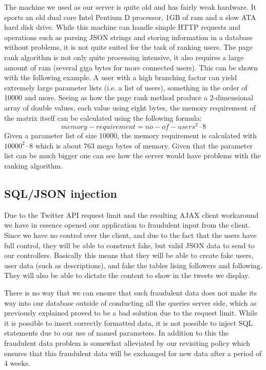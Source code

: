 The machine we used as our server is quite old and has fairly weak hardware. It sports an old dual core Intel Pentium D processor, 1GB of ram and a slow ATA hard disk drive. While this machine can handle simple HTTP requests and operations such as parsing JSON strings and storing information in a database without problems, it is not quite suited for the task of ranking users. The page rank algorithm is not only quite processing intensive, it also requires a large amount of ram (several giga bytes for more connected users). This can be shown with the following example. A user with a high branching factor can yield extremely large parameter lists (i.e. a list of users), something in the order of 10000 and more. Seeing as how the page rank method produce a 2-dimensional array of double values, each value using eight bytes, the memory requirement of the matrix itself can be calculated using the following formula:
\begin{displaymath}
memory-requirement = no-of-users^2 \cdot 8 
\end{displaymath}
Given a parameter list of size 10000, the memory requirement is calculated with \(10000^2 \cdot 8\) which is about 763 mega bytes of memory. Given that the parameter list can be much bigger one can see how the server would have problems with the ranking algorithm.

\subsection{SQL/JSON injection}
Due to the Twitter API request limit and the resulting AJAX client workaround we have in essence opened our application to fraudulent input from the client. Since we have no control over the client, and due to the fact that the users have full control, they will be able to construct fake, but valid JSON data to send to our controllers. Basically this means that they will be able to create fake users, user data (such as descriptions), and fake the tables lising followers and following. They will also be able to dictate the content to show in the tweets we display.

There is no way that we can ensure that such fraudulent data does not make its way into our database outside of conducting all the queries server side, which as previously explained proved to be a bad solution due to the request limit. While it is possible to insert correctly formatted data, it is not possible to inject SQL statements due to our use of named parameters. In addition to this the fraudulent data problem is somewhat alleviated by our revisiting policy which ensures that this fraudulent data will be exchanged for new data after a period of 4 weeks.
